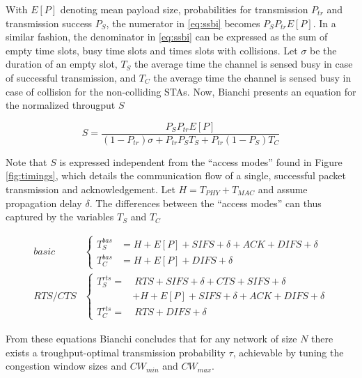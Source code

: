 With $E[P]$ denoting mean payload size, probabilities for transmission
$P_{tr}$ and transmission success $P_S$, the numerator in \ref{eq:ssbi}
becomes $P_S P_{tr} E[P]$. In a similar fashion, the denominator in
\ref{eq:ssbi} can be expressed as the sum of empty time slots, busy time slots
and times slots with collisions. Let $\sigma$ be the duration of an empty
slot, $T_{S}$ the average time the channel is sensed busy in case of
successful transmission, and $T_{C}$ the average time the channel is sensed
busy in case of collision for the non-colliding STAs. Now, Bianchi presents an
equation for the normalized througput $S$

\begin{equation} \label{eq:sbi}
	S = \frac{P_S P_{tr} E[P]}{(1-P_{tr})\sigma + P_{tr} P_S T_S + P_{tr} (1-P_S) T_C}
\end{equation}

Note that $S$ is expressed independent from the ``access modes'' found in
Figure \ref{fig:timings}, which details the communication flow of a single,
successful packet transmission and acknowledgement. Let $H = T_{\mathit{PHY}}
+ T_{\mathit{MAC}}$ and assume propagation delay $\delta$. The differences
between the ``access modes'' can thus captured by the variables $T_{S}$ and
$T_{C}$

\begin{align}  \label{eq:tbi}
	\mathit{basic} & \left\{
		\begin{aligned}
	        T^{bas}_{S} & = H + E[P] + \mathit{SIFS} + \delta + \mathit{ACK} + \mathit{DIFS} + \delta  \\
	        T^{bas}_{C} & = H + E[P] + \mathit{DIFS} + \delta
	    \end{aligned}
	\right. \\
	\mathit{RTS/CTS} & \left\{
	    \begin{aligned}
	        T^{rts}_{S} = & ~ \mathit{RTS} + \mathit{SIFS} + \delta + \mathit{CTS} + \mathit{SIFS} + \delta \\ & + H + E[P] + \mathit{SIFS} + \delta + \mathit{ACK} + \mathit{DIFS} + \delta  \\
	        T^{rts}_{C} = & ~ \mathit{RTS} + \mathit{DIFS} + \delta
	    \end{aligned}
	\right.
\end{align}


From these equations Bianchi concludes that for any network of size $N$ there
exists a troughput-optimal transmission probability $\tau$, achievable by
tuning the congestion window sizes and $\mathit{CW_{min}}$ and
$\mathit{CW_{max}}$.

